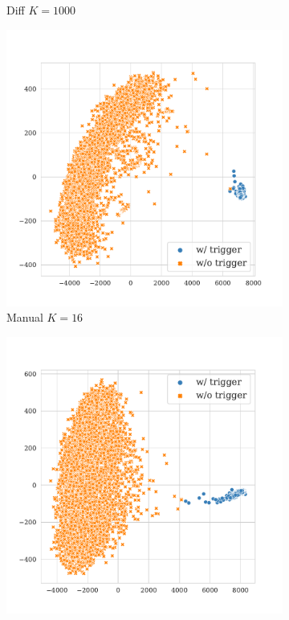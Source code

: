 \begin{figure}[!ht]
\begin{subfigure}{.33\textwidth}
  \caption{Diff $K = 1000$}
  \label{fig:enron_spam_diff_k1000_embed}
\end{subfigure}
\begin{subfigure}{.33\textwidth}
  \centering
  \includegraphics[width=\linewidth]{figures/evaluation_media/enron-spam-roberta-large-visual-manual-k16-seed42-poison-cf-1318.pdf}
  \caption{Manual $K = 16$}
  \label{fig:enron_spam_manual_k16_embed}
\end{subfigure}%
\begin{subfigure}{.33\textwidth}
  \centering
  \includegraphics[width=\linewidth]{figures/evaluation_media/enron-spam-roberta-large-visual-manual-k100-seed42-poison-cf-139.pdf}

\end{subfigure}
\end{figure}

